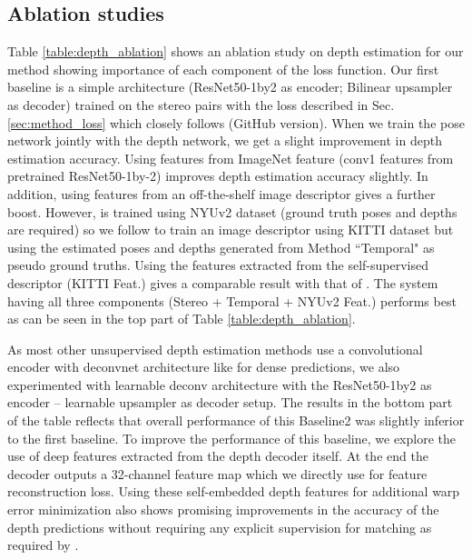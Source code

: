 \documentclass[10pt,twocolumn,letterpaper]{article}
\begin{document}
\subsection{Ablation studies}
\label{sec:ablation}

Table \ref{table:depth_ablation} shows an ablation study on depth estimation for our method showing importance of each component of the loss function. 
Our first baseline is a simple architecture (ResNet50-1by2 as encoder; Bilinear upsampler as decoder)
trained on the stereo pairs with the loss described in Sec.\ref{sec:method_loss} which closely follows \cite{garg2016depth} (GitHub version). 
When we train the pose network jointly with the depth network, we get a slight improvement in depth estimation accuracy. 
Using features from ImageNet feature (conv1 features from pretrained ResNet50-1by-2) improves depth estimation accuracy slightly.
In addition, using features from an off-the-shelf image descriptor \cite{weerasekera2017feature} gives a further boost. However, \cite{weerasekera2017feature} is trained using NYUv2 dataset \cite{Silberman2012nyuv2} (ground truth poses and depths are required) so we follow \cite{weerasekera2017feature} to train an image descriptor using KITTI dataset but using the estimated poses and depths generated from Method ``Temporal" as pseudo ground truths. Using the features extracted from the self-supervised descriptor (KITTI Feat.) gives a comparable result with that of \cite{weerasekera2017feature}. 
The system having all three components (Stereo + Temporal + NYUv2 Feat.) performs best as can be seen in the top part of Table \ref{table:depth_ablation}.  

As most other unsupervised depth estimation methods use a convolutional encoder with deconvnet architecture like \cite{noh2015learning}\cite{ronneberger2015u} for dense predictions, we also experimented with learnable deconv architecture with the ResNet50-1by2 as encoder -- learnable upsampler as decoder setup. The results in the bottom part of the table reflects that overall performance of this Baseline2 was slightly inferior to the first baseline. 
To improve the performance of this baseline, we explore the use of deep features extracted from the depth decoder itself. 
At the end the decoder outputs a 32-channel feature map which we directly use for feature reconstruction loss. Using these self-embedded depth features for additional warp error minimization also shows promising improvements in the accuracy of the depth predictions without requiring any explicit supervision for matching as required by \cite{weerasekera2017feature}.
\end{document}
